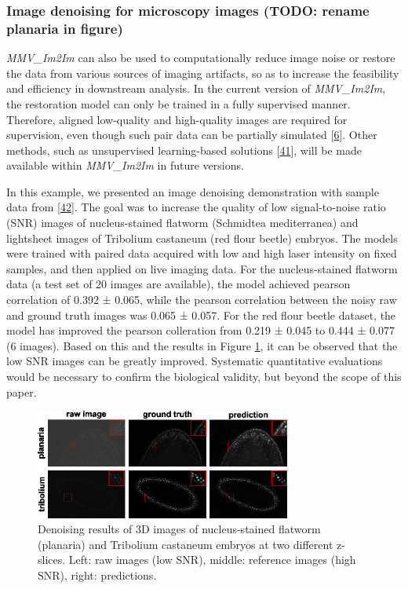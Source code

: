 \hypertarget{image-denoising-for-microscopy-images-todo-rename-planaria-in-figure}{%
\subsubsection{Image denoising for microscopy images (TODO: rename planaria in figure)}\label{image-denoising-for-microscopy-images-todo-rename-planaria-in-figure}}

\emph{MMV\_Im2Im} can also be used to computationally reduce image noise or restore the data from various sources of imaging artifacts, so as to increase the feasibility and efficiency in downstream analysis. In the current version of \emph{MMV\_Im2Im}, the restoration model can only be trained in a fully supervised manner. Therefore, aligned low-quality and high-quality images are required for supervision, even though such pair data can be partially simulated {[}\protect\hyperlink{ref-wcCVn8av}{6}{]}. Other methods, such as unsupervised learning-based solutions {[}\protect\hyperlink{ref-4vnyY9J9}{41}{]}, will be made available within \emph{MMV\_Im2Im} in future versions.

In this example, we presented an image denoising demonstration with sample data from {[}\protect\hyperlink{ref-12G712Zky}{42}{]}. The goal was to increase the quality of low signal-to-noise ratio (SNR) images of nucleus-stained flatworm (Schmidtea mediterranea) and lightsheet images of Tribolium castaneum (red flour beetle) embryos. The models were trained with paired data acquired with low and high laser intensity on fixed samples, and then applied on live imaging data. For the nucleus-stained flatworm data (a test set of 20 images are available), the model achieved pearson correlation of 0.392 ± 0.065, while the pearson correlation between the noisy raw and ground truth images was 0.065 ± 0.057. For the red flour beetle dataset, the model has improved the pearson colleration from 0.219 ± 0.045 to 0.444 ± 0.077 (6 images). Based on this and the results in Figure \ref{fig:denoising}, it can be observed that the low SNR images can be greatly improved. Systematic quantitative evaluations would be necessary to confirm the biological validity, but beyond the scope of this paper.

\begin{figure}
\hypertarget{fig:denoising}{%
\centering
\includegraphics[width=0.75\textwidth,height=\textheight]{images/denoising_justin.png}
\caption{Denoising results of 3D images of nucleus-stained flatworm (planaria) and Tribolium castaneum embryos at two different z-slices. Left: raw images (low SNR), middle: reference images (high SNR), right: predictions.}\label{fig:denoising}
}
\end{figure}

